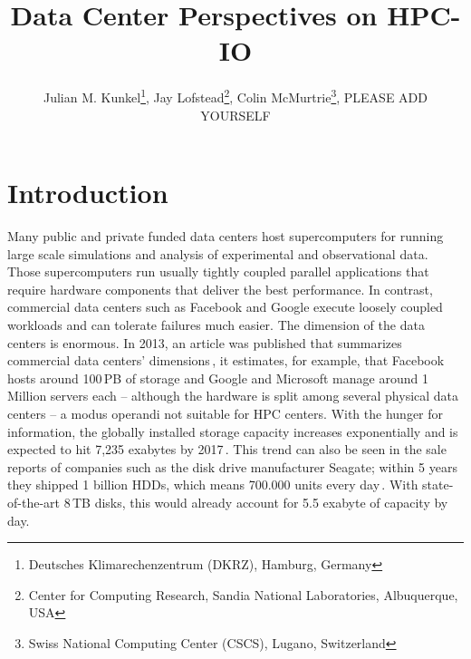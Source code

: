 \documentclass{superfri}
\numberwithin{equation}{section}
\begin{document}

\author{Julian M. Kunkel\footnote{\label{dkrz}Deutsches Klimarechenzentrum (DKRZ), Hamburg, Germany}, 
Jay Lofstead\footnote{Center for Computing Research, Sandia National Laboratories, Albuquerque, USA}, 
Colin McMurtrie\footnote{Swiss National Computing Center (CSCS), Lugano, Switzerland}, 
PLEASE ADD YOURSELF
} %

\title{Data Center Perspectives on HPC-IO}
\maketitle{}

\begin{abstract}

\noindent
{}
\end{abstract}

\section{Introduction}
\label{sec:intro}

Many public and private funded data centers host supercomputers for running large scale simulations and analysis of experimental and observational data.
Those supercomputers run usually tightly coupled parallel applications that require hardware components that deliver the best performance.
In contrast, commercial data centers such as Facebook and Google execute loosely coupled workloads and can tolerate failures much easier.
The dimension of the data centers is enormous.
In 2013, an article was published that summarizes commercial data centers' dimensions\,\cite{data13}, it estimates, for example, that 
Facebook hosts around 100\,PB of storage and Google and Microsoft manage around 1 Million servers each -- although the hardware is split among several physical data centers -- a modus operandi not suitable for HPC centers.
With the hunger for information, the globally installed storage capacity increases exponentially and is expected to hit 7,235 exabytes by 2017\,\cite{EXA13}.
This trend can also be seen in the sale reports of companies such as the disk drive manufacturer Seagate; within 5 years they shipped 1 billion HDDs, which means 700.000 units every day\,\cite{SG14}.  
With state-of-the-art 8\,TB disks, this would already account for 5.5 exabyte of capacity by day.
\end{document}
